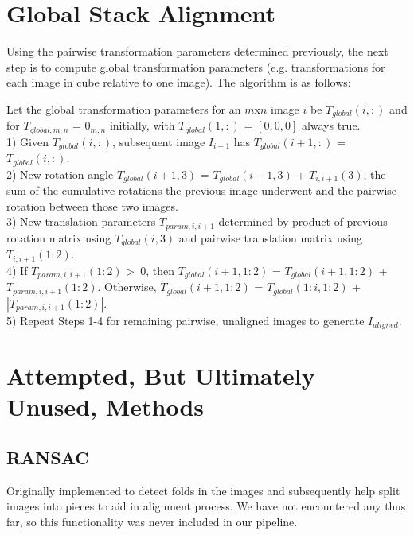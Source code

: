 \documentclass{article}
\begin{document}
\section{Global Stack Alignment}
Using the pairwise transformation parameters determined previously, the next step is to compute global transformation parameters (e.g. transformations for each image in cube relative to one image). The algorithm is as follows:
	\begin{algorithm}
	\DontPrintSemicolon
	Let the global transformation parameters for an $m$x$n$ image $i$ be $T_{global}(i,:)$ and for $T_{global,m,n}$ = $0_{m,n}$ initially, with $T_{global}(1,:)$ = $[0, 0, 0]$ always true. \\ 
	1) Given $T_{global}(i,:)$, subsequent image $I_{i+1}$ has $T_{global}(i+1,:)$ = $T_{global}(i,:)$. \\
	2) New rotation angle $T_{global}(i+1,3)$ = $T_{global}(i+1,3)$ + $T_{i,i+1}(3)$, the sum of the cumulative rotations the previous image underwent and the pairwise rotation between those two images. \\
	3) New translation parameters $T_{param,i,i+1}$ determined by product of previous rotation matrix using $T_{global}(i,3)$ and pairwise translation matrix using $T_{i,i+1}(1:2)$. \\
	4) If $T_{param,i,i+1}(1:2)$ \textgreater\ $0$, then $T_{global}(i+1,1:2)$ = $T_{global}(i+1,1:2)$ + $T_{param,i,i+1}(1:2)$. Otherwise, $T_{global}(i+1,1:2)$ = $T_{global}(1:i,1:2)$ + $|T_{param,i,i+1}(1:2)|$. \\
	5) Repeat Steps 1-4 for remaining pairwise, unaligned images to generate $I_{aligned}$. 
	\end{algorithm}

\section{Attempted, But Ultimately Unused, Methods}
\subsection{RANSAC}
Originally implemented to detect folds in the images and subsequently help split images into pieces to aid in alignment process. We have not encountered any thus far, so this functionality was never included in our pipeline.
\end{document}
